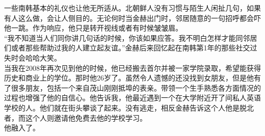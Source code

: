 一些南韩基本的礼仪也让他无所适从。北朝鲜人没有习惯与陌生人闲扯几句，如果有人这么做，会让人侧目的。无论何时当金赫出门时，邻居随意的一句招呼都会吓他一跳。作为响应，他只是转开视线或者有时候皱皱眉。\\

“我不知道当人们同你讲几句话的时候，你该如果应答。我不明白怎样才能同邻居们或者那些帮助过我的人建立起友谊。”金赫后来回忆起在南韩第1年的那些社交过失时会哈哈大笑。\\

当我在2008年再次见到他的时候，他已经搬去首尔并被一家学院录取，希望能获得历史和商业上的学位。那时他26岁了。虽然令人遗憾的还没找到女朋友，但是他有了很多朋友，包括一个来自茂山刚刚抵埠的表亲。带领一个生手熟悉各方面情况的过程也增强了他的自信心。他告诉我，他最近遇到一个在大学附近开了间私人英语学校的人。他们就在街头攀谈了起来。没有逃走，相反金赫告诉这个人他是脱北者，而这个人则邀请他免费去他的学校学习。\\

他融入了。\\
